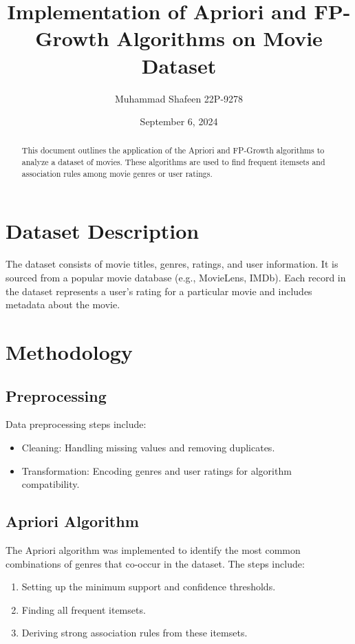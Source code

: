 \documentclass{article}
\title{Implementation of Apriori and FP-Growth Algorithms on Movie Dataset}
\author{Muhammad Shafeen 22P-9278}
\date{September 6, 2024}
\begin{document}
\maketitle

\begin{abstract}
This document outlines the application of the Apriori and FP-Growth algorithms to analyze a dataset of movies. These algorithms are used to find frequent itemsets and association rules among movie genres or user ratings.
\end{abstract}


\section{Dataset Description}
The dataset consists of movie titles, genres, ratings, and user information. It is sourced from a popular movie database (e.g., MovieLens, IMDb). Each record in the dataset represents a user's rating for a particular movie and includes metadata about the movie.

\section{Methodology}

\subsection{Preprocessing}
Data preprocessing steps include:
\begin{itemize}
    \item Cleaning: Handling missing values and removing duplicates.
    \item Transformation: Encoding genres and user ratings for algorithm compatibility.
\end{itemize}

\subsection{Apriori Algorithm}
The Apriori algorithm was implemented to identify the most common combinations of genres that co-occur in the dataset. The steps include:
\begin{enumerate}
    \item Setting up the minimum support and confidence thresholds.
    \item Finding all frequent itemsets.
    \item Deriving strong association rules from these itemsets.
\end{enumerate}
\end{document}
